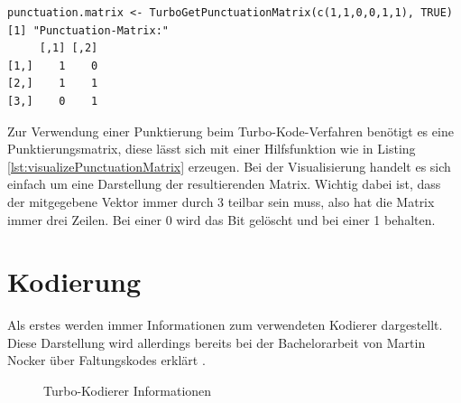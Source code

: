 \begin{lstlisting}[caption=Visualisierung der Punktierungssmatrix, label={lst:visualizePunctuationMatrix}, float=!ht]
punctuation.matrix <- TurboGetPunctuationMatrix(c(1,1,0,0,1,1), TRUE)
[1] "Punctuation-Matrix:"
     [,1] [,2]
[1,]    1    0
[2,]    1    1
[3,]    0    1
\end{lstlisting}

Zur Verwendung einer Punktierung beim Turbo-Kode-Verfahren benötigt es eine Punktierungsmatrix, diese lässt sich mit einer Hilfsfunktion wie in Listing \ref{lst:visualizePunctuationMatrix} erzeugen. Bei der Visualisierung handelt es sich einfach um eine Darstellung der resultierenden Matrix. Wichtig dabei ist, dass der mitgegebene Vektor immer durch 3 teilbar sein muss, also hat die Matrix immer drei Zeilen. Bei einer 0 wird das Bit gelöscht und bei einer 1 behalten.

\section{Kodierung}
\label{sec:visualization_encode}
Als erstes werden immer Informationen zum verwendeten Kodierer dargestellt. Diese Darstellung wird allerdings bereits bei der Bachelorarbeit von Martin Nocker über Faltungskodes erklärt \cite{nocker}.

\begin{figure}[!ht]
\centering
{}
\caption{Turbo-Kodierer Informationen}
\label{pic:TurboCoderInformation}
\end{figure}  

